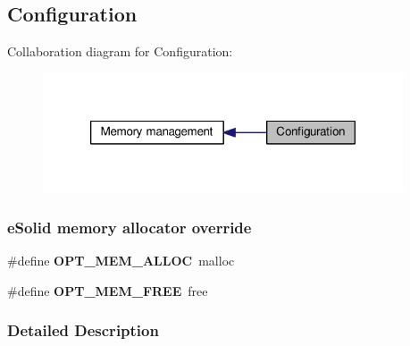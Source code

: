 \hypertarget{group__mem__cfg}{\subsection{Configuration}
\label{group__mem__cfg}
}
Collaboration diagram for Configuration\-:\nopagebreak
\begin{figure}[H]
\begin{center}
\leavevmode
\includegraphics[width=302pt]{group__mem__cfg}
\end{center}
\end{figure}
\subsubsection*{e\-Solid memory allocator override}
\begin{DoxyCompactItemize}
\item 
\hypertarget{group__mem__cfg_ga543701ab60ff8b87e4e1ec9ea0b03491}{\#define {\bfseries O\-P\-T\-\_\-\-M\-E\-M\-\_\-\-A\-L\-L\-O\-C}~malloc}\label{group__mem__cfg_ga543701ab60ff8b87e4e1ec9ea0b03491}

\item 
\hypertarget{group__mem__cfg_gaab59d354bf34173761c3f95d0662c22e}{\#define {\bfseries O\-P\-T\-\_\-\-M\-E\-M\-\_\-\-F\-R\-E\-E}~free}\label{group__mem__cfg_gaab59d354bf34173761c3f95d0662c22e}

\end{DoxyCompactItemize}


\subsubsection{Detailed Description}
